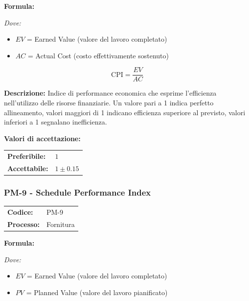 \documentclass[a4paper,11pt,oneside]{scrartcl}
\begin{document}
\vspace{0.3cm}
\noindent\textbf{Formula:}

\noindent\textit{Dove:}
\begin{itemize}[leftmargin=1.5cm, topsep=0pt, itemsep=0pt]
    \item $EV$ = Earned Value (valore del lavoro completato)
    \item $AC$ = Actual Cost (costo effettivamente sostenuto)
\end{itemize}

\[
\text{CPI} = \frac{EV}{AC}
\]

\noindent\textbf{Descrizione:} Indice di performance economica che esprime l'efficienza nell'utilizzo delle risorse finanziarie. Un valore pari a 1 indica perfetto allineamento, valori maggiori di 1 indicano efficienza superiore al previsto, valori inferiori a 1 segnalano inefficienza.

\vspace{0.2cm}
\noindent\textbf{Valori di accettazione:}
\vspace{0.1cm}

\noindent
\begin{tabular}{@{}ll@{}}
\textbf{Preferibile:} & $1$ \\
\textbf{Accettabile:} & $1 \pm 0.15$ \\
\end{tabular}

\subsubsection{PM-9 - Schedule Performance Index}

\noindent
\begin{tabular}{@{}p{}p{}@{}}
\textbf{Codice:} & PM-9 \\
\textbf{Processo:} & Fornitura \\
\end{tabular}

\vspace{0.3cm}
\noindent\textbf{Formula:}

\noindent\textit{Dove:}
\begin{itemize}[leftmargin=1.5cm, topsep=0pt, itemsep=0pt]
    \item $EV$ = Earned Value (valore del lavoro completato)
    \item $PV$ = Planned Value (valore del lavoro pianificato)
\end{itemize}
\end{document}
